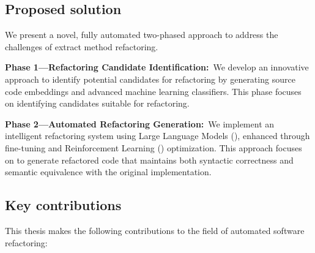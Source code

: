 \subsection{Proposed solution}
We present a novel, fully automated two-phased approach to address the challenges of extract method refactoring.

\textbf{Phase 1---Refactoring Candidate Identification:}\
We develop an innovative approach to identify potential candidates for \exm{} refactoring by generating source code embeddings and advanced machine learning classifiers. This phase focuses on identifying candidates suitable for \exm{} refactoring.

\textbf{Phase 2---Automated Refactoring Generation:}\
We implement an intelligent refactoring system using Large Language Models (\llmsc{}), enhanced through fine-tuning and Reinforcement Learning (\rl{}) optimization. This approach focuses on to generate refactored code that maintains both syntactic correctness and semantic equivalence with the original implementation.

\subsection{Key contributions}
This thesis makes the following contributions to the field of automated software refactoring:

